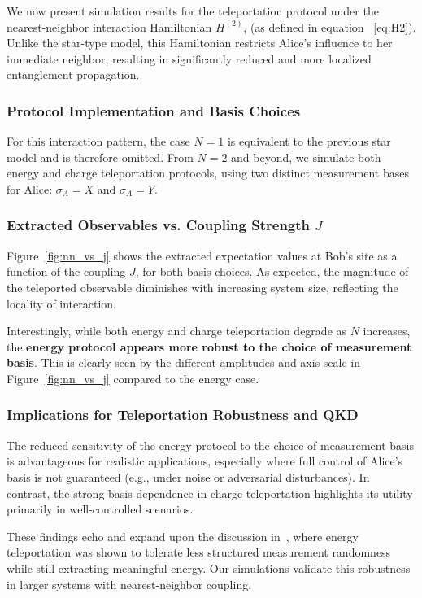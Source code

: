 We now present simulation results for the teleportation protocol under the nearest-neighbor interaction Hamiltonian \( H^{(2)} \), (as defined in equation ~\ref{eq:H2}). Unlike the star-type model, this Hamiltonian restricts Alice’s influence to her immediate neighbor, resulting in significantly reduced and more localized entanglement propagation.

\subsubsection{Protocol Implementation and Basis Choices}

For this interaction pattern, the case \( N = 1 \) is equivalent to the previous star model and is therefore omitted. From \( N = 2 \) and beyond, we simulate both energy and charge teleportation protocols, using two distinct measurement bases for Alice: \( \sigma_A = X \) and \( \sigma_A = Y \).

\subsubsection{Extracted Observables vs. Coupling Strength \texorpdfstring{\( J \)}{J}}

Figure~\ref{fig:nn_vs_j} shows the extracted expectation values at Bob’s site as a function of the coupling \( J \), for both basis choices. As expected, the magnitude of the teleported observable diminishes with increasing system size, reflecting the locality of interaction.

Interestingly, while both energy and charge teleportation degrade as \( N \) increases, the \textbf{energy protocol appears more robust to the choice of measurement basis}. This is clearly seen by the different amplitudes and axis scale in Figure~\ref{fig:nn_vs_j} compared to the energy case.

\subsubsection{Implications for Teleportation Robustness and QKD}

The reduced sensitivity of the energy protocol to the choice of measurement basis is advantageous for realistic applications, especially where full control of Alice’s basis is not guaranteed (e.g., under noise or adversarial disturbances). In contrast, the strong basis-dependence in charge teleportation highlights its utility primarily in well-controlled scenarios.

These findings echo and expand upon the discussion in~\cite{IkedaTeleportingCharge, QKDbyQET}, where energy teleportation was shown to tolerate less structured measurement randomness while still extracting meaningful energy. Our simulations validate this robustness in larger systems with nearest-neighbor coupling.
